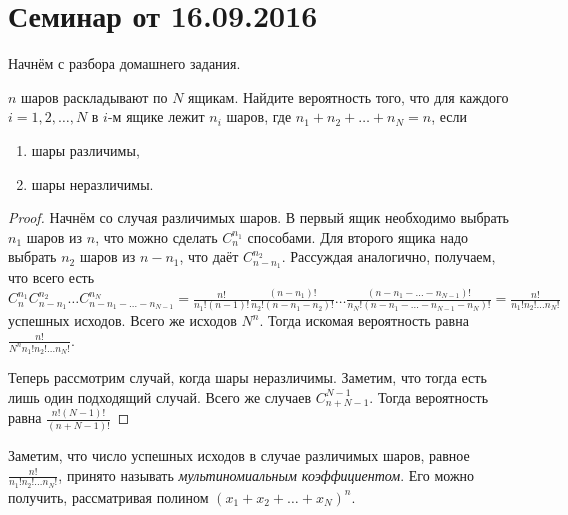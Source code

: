 \documentclass[a4paper,12pt]{article}
\begin{document}
\maketitle

\section{Семинар от 16.09.2016}
Начнём с разбора домашнего задания.
\begin{problem}
	\(n\) шаров раскладывают по \(N\) ящикам. Найдите вероятность того, что для каждого \(i = 1, 2, \ldots, N\) в \(i\)-м ящике лежит \(n_i\) шаров, где \(n_1 + n_2 + \ldots + n_N = n\), если
	\begin{enumerate}
		\item шары различимы,
		\item шары неразличимы.
	\end{enumerate}
\end{problem}
\begin{proof}
	Начнём со случая различимых шаров. В первый ящик необходимо выбрать \(n_1\) шаров из \(n\), что можно сделать \(C_{n}^{n_1}\) способами. Для второго ящика надо выбрать \(n_2\) шаров из \(n - n_1\), что даёт \(C_{n - n_1}^{n_2}\). Рассуждая аналогично, получаем, что всего есть \(C_{n}^{n_1}C_{n - n_1}^{n_2} \ldots C_{n - n_1 - \ldots - n_{N - 1}}^{n_{N}} = \frac{n!}{n_{1}!(n - 1)!}\frac{(n - n_1)!}{n_2!(n - n_1 - n_2)!}\ldots\frac{(n - n_1 - \ldots - n_{N - 1})!}{n_N!(n - n_1 - \ldots - n_{N - 1} - n_N)!} = \frac{n!}{n_{1}!n_{2}!\ldots n_{N}!}\) успешных исходов. Всего же исходов \(N^{n}\). Тогда искомая вероятность равна \(\frac{n!}{N^{n}n_{1}!n_{2}!\ldots n_{N}!}\).
	
	Теперь рассмотрим случай, когда шары неразличимы. Заметим, что тогда есть лишь один подходящий случай. Всего же случаев \(C_{n + N - 1}^{N - 1}\). Тогда вероятность равна \(\frac{n!(N - 1)!}{(n + N - 1)!}\)
\end{proof}
\begin{remark}
	Заметим, что число успешных исходов в случае различимых шаров, равное \(\frac{n!}{n_{1}!n_{2}!\ldots n_{N}!}\), принято называть \emph{мультиномиальным коэффициентом}. Его можно получить, рассматривая полином \((x_1 + x_2 + \ldots + x_N)^{n}\).
\end{remark}
\end{document}
